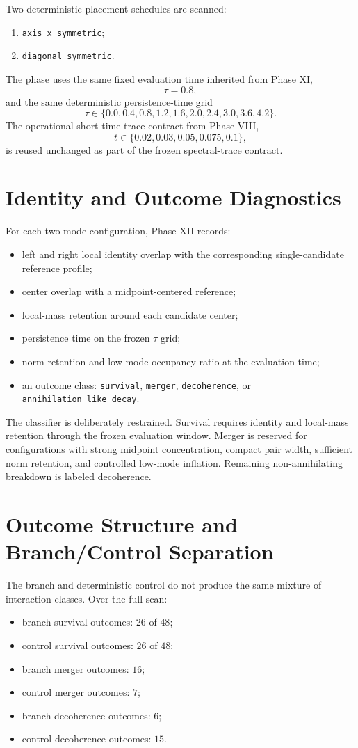 \documentclass[11pt]{article}
\begin{document}
Two deterministic placement schedules are scanned:
\begin{enumerate}
\item \texttt{axis\_x\_symmetric};
\item \texttt{diagonal\_symmetric}.
\end{enumerate}

The phase uses the same fixed evaluation time inherited from Phase XI,
\[
\tau = 0.8,
\]
and the same deterministic persistence-time grid
\[
\tau \in \{0.0,0.4,0.8,1.2,1.6,2.0,2.4,3.0,3.6,4.2\}.
\]
The operational short-time trace contract from Phase VIII,
\[
t \in \{0.02,0.03,0.05,0.075,0.1\},
\]
is reused unchanged as part of the frozen spectral-trace contract.

\section{Identity and Outcome Diagnostics}

For each two-mode configuration, Phase XII records:
\begin{itemize}
\item left and right local identity overlap with the corresponding single-candidate reference profile;
\item center overlap with a midpoint-centered reference;
\item local-mass retention around each candidate center;
\item persistence time on the frozen $\tau$ grid;
\item norm retention and low-mode occupancy ratio at the evaluation time;
\item an outcome class: \texttt{survival}, \texttt{merger}, \texttt{decoherence}, or \texttt{annihilation\_like\_decay}.
\end{itemize}

The classifier is deliberately restrained. Survival requires identity and local-mass retention through the frozen evaluation window. Merger is reserved for configurations with strong midpoint concentration, compact pair width, sufficient norm retention, and controlled low-mode inflation. Remaining non-annihilating breakdown is labeled decoherence.

\section{Outcome Structure and Branch/Control Separation}

The branch and deterministic control do not produce the same mixture of interaction classes. Over the full scan:
\begin{itemize}
\item branch survival outcomes: $26$ of $48$;
\item control survival outcomes: $26$ of $48$;
\item branch merger outcomes: $16$;
\item control merger outcomes: $7$;
\item branch decoherence outcomes: $6$;
\item control decoherence outcomes: $15$.
\end{itemize}
\end{document}
